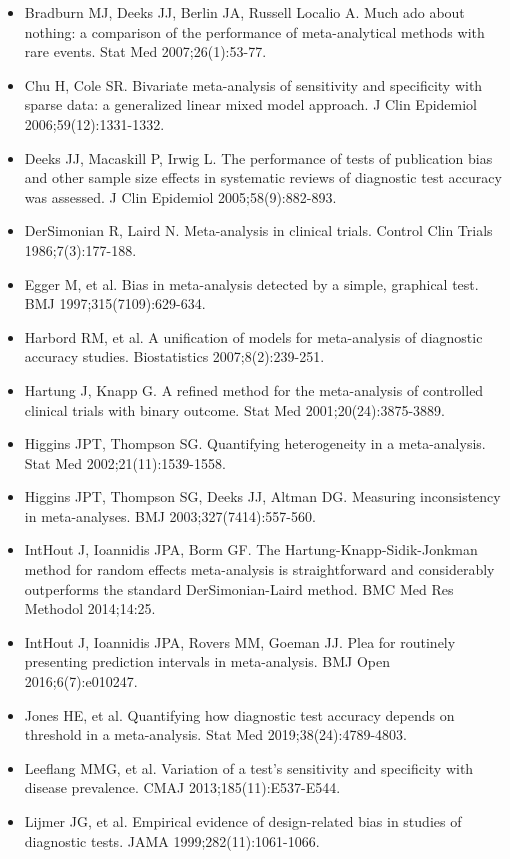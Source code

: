 \begin{itemize}
\item Bradburn MJ, Deeks JJ, Berlin JA, Russell Localio A. Much ado about nothing: a comparison of the performance of meta-analytical methods with rare events. Stat Med 2007;26(1):53-77.
\item Chu H, Cole SR. Bivariate meta-analysis of sensitivity and specificity with sparse data: a generalized linear mixed model approach. J Clin Epidemiol 2006;59(12):1331-1332.
\item Deeks JJ, Macaskill P, Irwig L. The performance of tests of publication bias and other sample size effects in systematic reviews of diagnostic test accuracy was assessed. J Clin Epidemiol 2005;58(9):882-893.
\item DerSimonian R, Laird N. Meta-analysis in clinical trials. Control Clin Trials 1986;7(3):177-188.
\item Egger M, et al. Bias in meta-analysis detected by a simple, graphical test. BMJ 1997;315(7109):629-634.
\item Harbord RM, et al. A unification of models for meta-analysis of diagnostic accuracy studies. Biostatistics 2007;8(2):239-251.
\item Hartung J, Knapp G. A refined method for the meta-analysis of controlled clinical trials with binary outcome. Stat Med 2001;20(24):3875-3889.
\item Higgins JPT, Thompson SG. Quantifying heterogeneity in a meta-analysis. Stat Med 2002;21(11):1539-1558.
\item Higgins JPT, Thompson SG, Deeks JJ, Altman DG. Measuring inconsistency in meta-analyses. BMJ 2003;327(7414):557-560.
\item IntHout J, Ioannidis JPA, Borm GF. The Hartung-Knapp-Sidik-Jonkman method for random effects meta-analysis is straightforward and considerably outperforms the standard DerSimonian-Laird method. BMC Med Res Methodol 2014;14:25.
\item IntHout J, Ioannidis JPA, Rovers MM, Goeman JJ. Plea for routinely presenting prediction intervals in meta-analysis. BMJ Open 2016;6(7):e010247.
\item Jones HE, et al. Quantifying how diagnostic test accuracy depends on threshold in a meta-analysis. Stat Med 2019;38(24):4789-4803.
\item Leeflang MMG, et al. Variation of a test's sensitivity and specificity with disease prevalence. CMAJ 2013;185(11):E537-E544.
\item Lijmer JG, et al. Empirical evidence of design-related bias in studies of diagnostic tests. JAMA 1999;282(11):1061-1066.

\end{itemize}
